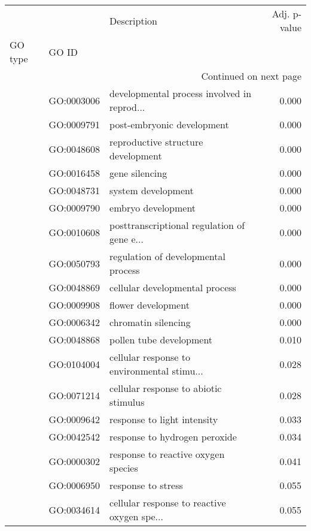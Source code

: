 \begin{longtable}{lllr}
\toprule
   &            &                                  Description &  Adj. p-value \\
GO type & GO ID &                                              &               \\
\midrule
\endhead
\midrule
\multicolumn{4}{r}{{Continued on next page}} \\
\midrule
\endfoot

\bottomrule
\endlastfoot
\multirow{19}{*}{BP} & GO:0003006 &  developmental process involved in reprod... &         0.000 \\
   & GO:0009791 &                   post-embryonic development &         0.000 \\
   & GO:0048608 &           reproductive structure development &         0.000 \\
   & GO:0016458 &                               gene silencing &         0.000 \\
   & GO:0048731 &                           system development &         0.000 \\
   & GO:0009790 &                           embryo development &         0.000 \\
   & GO:0010608 &  posttranscriptional regulation of gene e... &         0.000 \\
   & GO:0050793 &          regulation of developmental process &         0.000 \\
   & GO:0048869 &               cellular developmental process &         0.000 \\
   & GO:0009908 &                           flower development &         0.000 \\
   & GO:0006342 &                          chromatin silencing &         0.000 \\
   & GO:0048868 &                      pollen tube development &         0.010 \\
   & GO:0104004 &  cellular response to environmental stimu... &         0.028 \\
   & GO:0071214 &        cellular response to abiotic stimulus &         0.028 \\
   & GO:0009642 &                  response to light intensity &         0.033 \\
   & GO:0042542 &                response to hydrogen peroxide &         0.034 \\
   & GO:0000302 &          response to reactive oxygen species &         0.041 \\
   & GO:0006950 &                           response to stress &         0.055 \\
   & GO:0034614 &  cellular response to reactive oxygen spe... &         0.055 \\
\end{longtable}
